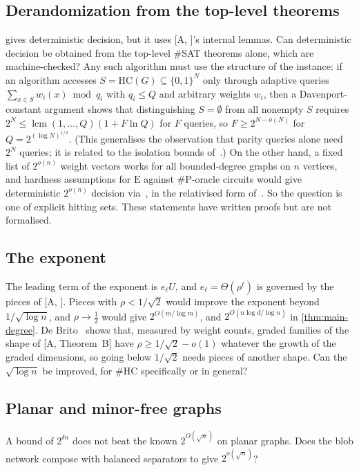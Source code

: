 \documentclass[11pt]{amsart}
\theoremstyle{plain}
\theoremstyle{definition}
\theoremstyle{remark}
\numberwithin{equation}{section}
\newcommand{\HC}{\#\mathrm{HC}}
\newcommand{\A}[1][]{\textup{[A\if\relax\detokenize{#1}\relax\else, #1\fi]}}
\begin{document}
\subsection{Derandomization from the top-level theorems}  gives deterministic
decision, but it uses \A's internal lemmas. Can deterministic decision be obtained from the
top-level $\#$SAT theorems alone, which are machine-checked? Any such algorithm must use the
structure of the instance: if an algorithm accesses $S=\mathrm{HC}(G)\subseteq\{0,1\}^N$ only
through adaptive queries $\sum_{x\in S}w_i(x)\bmod q_i$ with $q_i\le Q$ and arbitrary weights
$w_i$, then a Davenport-constant argument shows that distinguishing $S=\emptyset$ from all nonempty
$S$ requires $2^N\le\operatorname{lcm}(1,\dots,Q)(1+F\ln Q)$ for $F$ queries, so $F\ge2^{N-o(N)}$
for $Q=2^{(\log N)^{1/2}}$. (This generalises the observation that parity queries alone need $2^N$
queries; it is related to the isolation bounds of~\cite{DKMW13}.) On the other hand, a fixed list
of $2^{o(n)}$ weight vectors works for all bounded-degree graphs on $n$ vertices, and hardness
assumptions for $\mathrm E$ against $\#\mathrm P$-oracle circuits would give deterministic
$2^{o(n)}$ decision via~\cite{ImpagliazzoWigderson97}, in the relativised form
of~\cite{KvM02}. So the question is one of explicit hitting
sets. These statements have written proofs but are not formalised.

\subsection{The exponent} The leading term of the exponent is $e_\ell U$, and $e_\ell=\Theta(\rho^\ell)$
is governed by the pieces of \A. Pieces with $\rho<1/\sqrt2$ would improve the exponent beyond
$1/\sqrt{\log n}$, and $\rho\to\frac12$ would give $2^{O(m/\log m)}$, and
$2^{O(n\log\bar d/\log n)}$ in \cref{thm:main-degree}. De Brito~\cite{deBrito26} shows that,
measured by weight counts, graded families of the shape of \A[Theorem~B] have $\rho\ge1/\sqrt2-o(1)$
whatever the growth of the graded dimensions, so going below $1/\sqrt2$ needs pieces of another
shape. Can the $\sqrt{\log n}$ be improved, for $\HC$ specifically or in general?

\subsection{Planar and minor-free graphs} A bound of $2^{\delta n}$ does not beat the known
$2^{O(\sqrt n)}$ on planar graphs. Does the blob network compose with balanced separators to give
$2^{o(\sqrt n)}$?
\end{document}
